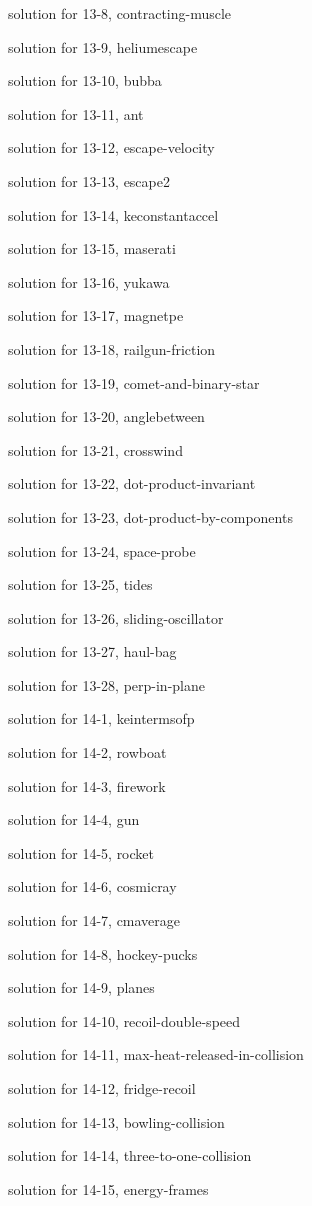 \documentclass{problems}
\begin{document}
solution for 13-8, contracting-muscle

solution for 13-9, heliumescape

solution for 13-10, bubba

solution for 13-11, ant

solution for 13-12, escape-velocity

solution for 13-13, escape2

solution for 13-14, keconstantaccel

solution for 13-15, maserati

solution for 13-16, yukawa

solution for 13-17, magnetpe

solution for 13-18, railgun-friction

solution for 13-19, comet-and-binary-star

solution for 13-20, anglebetween

solution for 13-21, crosswind

solution for 13-22, dot-product-invariant

solution for 13-23, dot-product-by-components

solution for 13-24, space-probe

solution for 13-25, tides

solution for 13-26, sliding-oscillator

solution for 13-27, haul-bag

solution for 13-28, perp-in-plane

solution for 14-1, keintermsofp

solution for 14-2, rowboat

solution for 14-3, firework

solution for 14-4, gun

solution for 14-5, rocket

solution for 14-6, cosmicray

solution for 14-7, cmaverage

solution for 14-8, hockey-pucks

solution for 14-9, planes

solution for 14-10, recoil-double-speed

solution for 14-11, max-heat-released-in-collision

solution for 14-12, fridge-recoil

solution for 14-13, bowling-collision

solution for 14-14, three-to-one-collision

solution for 14-15, energy-frames
\end{document}
